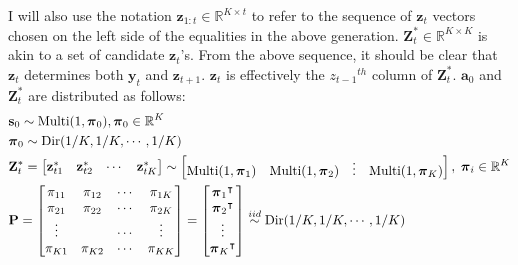I will also use the notation $\mathbf{z}_{1:t} \in \mathbb{R}^{K\times t}$ to refer to the sequence of $\mathbf{z}_t$ vectors chosen on the left side of the equalities in the above generation.
$\mathbf{Z}_t^* \in \mathbb{R}^{K\times K}$ is akin to a set of candidate $\mathbf{z}_t$'s.
From the above sequence, it should be clear that $\mathbf{z}_{t}$ determines both $\mathbf{y}_{t}$ and $\mathbf{z}_{t+1}$.
$\mathbf{z}_{t}$ is effectively the $z_{t-1}{}^{th}$ column of $\mathbf{Z}^*_{t}$.
$\mathbf{a}_0$ and $\mathbf{Z}^*_{t}$ are distributed as follows:
\begin{align}
    &\mathbf{s}_0 \sim \text{Multi}(1, \boldsymbol{\pi}_0), \boldsymbol{\pi}_0 \in \mathbb{R}^K\\
    &\boldsymbol{\pi}_0 \sim \text{Dir}(1/K, 1/K, \cdots, 1/K)\\
    \label{q2:zt+1_dist}
      &\mathbf{Z}_{t}^* = 
    \begin{bmatrix}\mathbf{z}_{t1}^*&
        \mathbf{z}_{t2}^*&
        \cdots & 
        \mathbf{z}_{tK}^*
            \end{bmatrix} 
    \sim 
    \begin{bmatrix}
        \text{Multi}(1, \boldsymbol{\pi}_{1})&
        \text{Multi}(1, \boldsymbol{\pi}_{2})& 
        \vdots&
        \text{Multi}(1, \boldsymbol{\pi}_{K})
    \end{bmatrix},\;
    \boldsymbol{\pi}_i\in \mathbb{R}^K\\
    &\mathbf{P} = 
    \begin{bmatrix}
        \pi_{11} & \pi_{12} & \cdots &\pi_{1K}\\
        \pi_{21} & \pi_{22} & \cdots &\pi_{2K}\\
        \vdots & &\cdots&\vdots \\ 
\pi_{K1} & \pi_{K2} & \cdots &\pi_{KK}\\
    \end{bmatrix} 
    =
    \begin{bmatrix}
        \boldsymbol{\pi}_1{}^\intercal\\
        \boldsymbol{\pi}_2{}^\intercal\\
        \vdots \\ 
        \boldsymbol{\pi}_K{}^\intercal
    \end{bmatrix} 
      \overset{iid}{\sim} \text{Dir}(1/K, 1/K, \cdots , 1/K)\\
\end{align}

